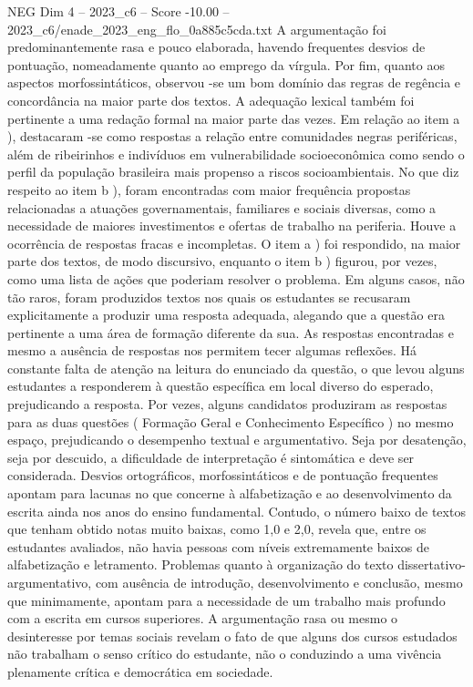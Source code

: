\begin{textsample}{NEG Dim 4 – 2023\_c6 – Score -10.00 – 2023\_c6/enade\_2023\_eng\_flo\_0a885c5cda.txt}
A argumentação foi predominantemente rasa e pouco elaborada, havendo frequentes desvios de pontuação, nomeadamente quanto ao emprego da vírgula.
Por fim, quanto aos aspectos morfossintáticos, observou -se um bom domínio das regras de regência e concordância na maior parte dos textos.
A adequação lexical também foi pertinente a uma redação formal na maior parte das vezes.
Em relação ao item a ), destacaram -se como respostas a relação entre comunidades negras periféricas, além de ribeirinhos e indivíduos em vulnerabilidade socioeconômica como sendo o perfil da população brasileira mais propenso a riscos socioambientais.
No que diz respeito ao item b ), foram encontradas com maior frequência propostas relacionadas a atuações governamentais, familiares e sociais diversas, como a necessidade de maiores investimentos e ofertas de trabalho na periferia.
Houve a ocorrência de respostas fracas e incompletas.
O item a ) foi respondido, na maior parte dos textos, de modo discursivo, enquanto o item b ) figurou, por vezes, como uma lista de ações que poderiam resolver o problema.
Em alguns casos, não tão raros, foram produzidos textos nos quais os estudantes se recusaram explicitamente a produzir uma resposta adequada, alegando que a questão era pertinente a uma área de formação diferente da sua.
As respostas encontradas e mesmo a ausência de respostas nos permitem tecer algumas reflexões.
Há constante falta de atenção na leitura do enunciado da questão, o que levou alguns estudantes a responderem à questão específica em local diverso do esperado, prejudicando a resposta.
Por vezes, alguns candidatos produziram as respostas para as duas questões ( Formação Geral e Conhecimento Específico ) no mesmo espaço, prejudicando o desempenho textual e argumentativo.
Seja por desatenção, seja por descuido, a dificuldade de interpretação é sintomática e deve ser considerada.
Desvios ortográficos, morfossintáticos e de pontuação frequentes apontam para lacunas no que concerne à alfabetização e ao desenvolvimento da escrita ainda nos anos do ensino fundamental.
Contudo, o número baixo de textos que tenham obtido notas muito baixas, como 1,0 e 2,0, revela que, entre os estudantes avaliados, não havia pessoas com níveis extremamente baixos de alfabetização e letramento.
Problemas quanto à organização do texto dissertativo-argumentativo, com ausência de introdução, desenvolvimento e conclusão, mesmo que minimamente, apontam para a necessidade de um trabalho mais profundo com a escrita em cursos superiores.
A argumentação rasa ou mesmo o desinteresse por temas sociais revelam o fato de que alguns dos cursos estudados não trabalham o senso crítico do estudante, não o conduzindo a uma vivência plenamente crítica e democrática em sociedade.

\end{textsample}
